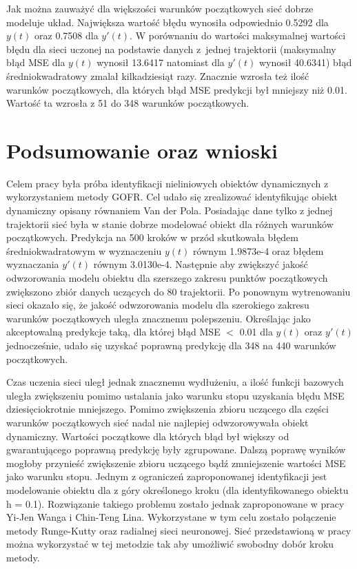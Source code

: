 Jak można zauważyć dla większości warunków początkowych sieć dobrze modeluje układ. Największa wartość błędu wynosiła odpowiednio 0.5292 dla $y(t)$ oraz 0.7508 dla $y'(t)$. W porównaniu do wartości maksymalnej wartości błędu dla sieci uczonej na podstawie danych z~jednej trajektorii (maksymalny błąd MSE dla $y(t)$ wynosił 13.6417 natomiast dla $y'(t)$ wynosił 40.6341) błąd średniokwadratowy zmalał kilkadziesiąt razy. Znacznie wzrosła też ilość warunków początkowych, dla których błąd MSE predykcji był mniejszy niż 0.01. Wartość ta wzrosła z 51 do 348 warunków początkowych.

\clearpage
\section{Podsumowanie oraz wnioski}

Celem pracy była próba identyfikacji nieliniowych obiektów dynamicznych z wykorzystaniem metody GOFR. Cel udało się zrealizować identyfikując obiekt dynamiczny opisany równaniem Van der Pola. Posiadając dane tylko z jednej trajektorii sieć była w stanie dobrze modelować obiekt dla różnych warunków początkowych. Predykcja na 500 kroków w przód skutkowała błędem średniokwadratowym w wyznaczeniu $y(t)$ równym 1.9873e-4 oraz błędem wyznaczania $y'(t)$ równym 3.0130e-4. Następnie aby zwiększyć jakość odwzorowania modelu obiektu dla szerszego zakresu punktów początkowych zwiększono zbiór danych uczących do 80 trajektorii. Po ponownym wytrenowaniu sieci okazało się, że jakość odwzorowania modelu dla szerokiego zakresu warunków początkowych uległa znacznemu polepszeniu.
Określając jako akceptowalną predykcje taką, dla której błąd MSE $<$ 0.01 dla $y(t)$ oraz $y'(t)$ jednocześnie, udało się uzyskać poprawną predykcję dla 348 na 440 warunków początkowych.

Czas uczenia sieci uległ jednak znacznemu wydłużeniu, a ilość funkcji bazowych uległa zwiększeniu pomimo ustalania jako warunku stopu uzyskania błędu MSE dziesięciokrotnie mniejszego. Pomimo zwiększenia zbioru uczącego dla części warunków początkowych sieć nadal nie najlepiej odwzorowywała obiekt dynamiczny.  Wartości początkowe dla których błąd był większy od gwarantującego poprawną predykcję były zgrupowane. Dalszą poprawę wyników mogłoby przynieść zwiększenie zbioru uczącego bądź zmniejszenie wartości MSE jako warunku stopu. Jednym z ograniczeń zaproponowanej identyfikacji jest modelowanie obiektu dla z góry określonego kroku (dla identyfikowanego obiektu h = 0.1). Rozwiązanie takiego problemu zostało jednak zaproponowane w pracy Yi-Jen Wanga i Chin-Teng Lina\cite{Wang}. Wykorzystane w tym celu zostało połączenie metody Runge-Kutty oraz radialnej sieci neuronowej. Sieć przedstawioną w pracy można wykorzystać w tej metodzie tak aby umożliwić swobodny dobór kroku metody.

